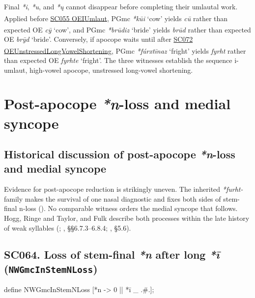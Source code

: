 \documentclass[
  british,
  a4paper,
  openany]{book}
\providecommand{\Pred}[1]{\textsuperscript{\dag}\emph{#1}}
\providecommand{\Recon}[1]{\emph{*#1}}
{\catcode`→=\active \global\def→{\ensuremath{\rightarrow}}}
\providecommand{\texorpdfstring}[2]{#1}
\providecommand{\Pred}[1]{\textsuperscript{\dag}\emph{#1}}
\providecommand{\Recon}[1]{\emph{*#1}}
{\catcode`→=\active \global\def→{\ensuremath{\rightarrow}}}
\begin{document}
Final \emph{*i}, \emph{*u}, and \emph{*ų} cannot disappear before
completing their umlautal work. Applied before
\hyperref[rule-OEIUmlaut]{SC055 OEIUmlaut}, PGmc \Recon{kūi} `cow'
yields \Pred{cū} rather than expected OE \emph{cȳ} `cow', and PGmc
\Recon{brūdiz} `bride' yields \Pred{brūd} rather than expected OE
\emph{brȳd} `bride'. Conversely, if apocope waits until after
\hyperref[rule-OEUnstressedLongVowelShortening]{SC072
OEUnstressedLongVowelShortening}, PGmc \Recon{fúrxtīnaz} `fright' yields
\Pred{fyrht} rather than expected OE \emph{fyrhte} `fright'. The three
witnesses establish the sequence i-umlaut, high-vowel apocope,
unstressed long-vowel shortening.

\newpage

\section{\texorpdfstring{Post-apocope \emph{*n}-loss and medial
syncope}{Post-apocope -loss and medial syncope}}\label{post-apocope--loss-and-medial-syncope}

\subsection{\texorpdfstring{Historical discussion of post-apocope
\emph{*n}-loss and medial
syncope}{Historical discussion of post-apocope -loss and medial syncope}}\label{historical-discussion-of-post-apocope--loss-and-medial-syncope}

Evidence for post-apocope reduction is strikingly uneven. The inherited
\emph{*furht-} family makes the survival of one nasal diagnostic and
fixes both sides of stem-final n-loss
(). No comparable witness
orders the medial syncope that follows. Hogg, Ringe and Taylor, and Fulk
describe both processes within the late history of weak syllables
(;
,
§§6.7.3--6.8.4; , §5.6).

\subsection{\texorpdfstring{SC064. Loss of stem-final \emph{*n} after
long \emph{*ī}
(\texttt{NWGmcInStemNLoss})}{SC064. Loss of stem-final  after long  (NWGmcInStemNLoss)}}\label{rule-NWGmcInStemNLoss}

\begin{ReaderFacingFoma}
define NWGmcInStemNLoss [{*n} -> 0 || {*ī} _ .#.];
\end{ReaderFacingFoma}
\end{document}
